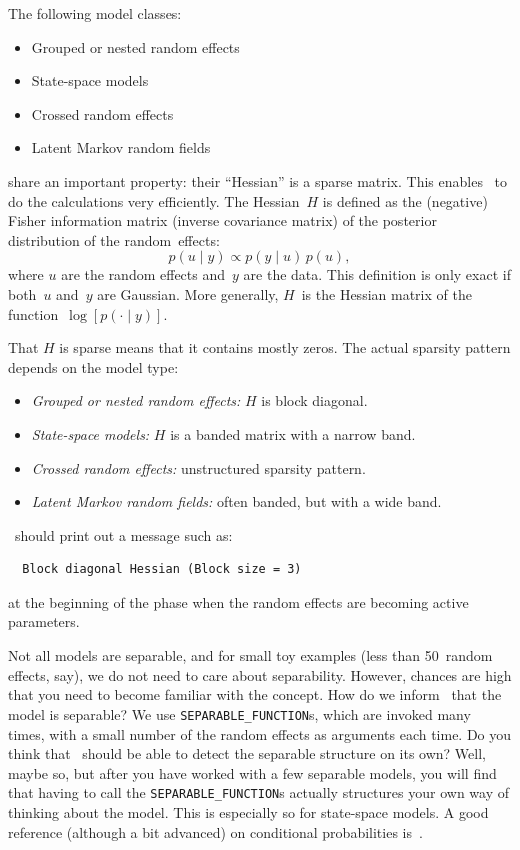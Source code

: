 \documentclass{admbmanual}
\newcommand{\citeasnoun}{\cite}
\begin{document}
The following model classes:
\begin{itemize}
  \item Grouped or nested random effects
  \item State-space models
  \item Crossed random effects
  \item Latent Markov random fields
\end{itemize}
share an important property: their ``Hessian'' is a sparse matrix. This enables
\scAR\ to do the calculations very efficiently. The Hessian~$H$ is defined as
the (negative) Fisher information matrix (inverse covariance matrix) of the
posterior distribution of the random~effects:
\begin{equation}
  p(u \mid y) \propto p(y \mid u)\, p(u),
  \label{p(u|y)}
\end{equation}
where $u$ are the random effects and~$y$ are the data. This definition is only
exact if both~$u$ and~$y$ are Gaussian. More generally, $H$~is the Hessian
matrix of the function~$\log\left[p(\cdot \mid y)\right]$.

That $H$ is sparse means that it contains mostly zeros. The actual sparsity
pattern depends on the model type:
\begin{itemize}
  \item \textit{Grouped or nested random effects:} $H$ is block diagonal.
   \item \textit{State-space models:} $H$ is a banded matrix with a narrow band.
   \item \textit{Crossed random effects:} unstructured sparsity pattern.
   \item \textit{Latent Markov random fields:} often banded, but with a wide
   band.
\end{itemize}
\scAR\ should print out a message such as:
\begin{lstlisting}
  Block diagonal Hessian (Block size = 3)
\end{lstlisting}
at the beginning of the phase when the random effects are becoming active
parameters.

Not all models are separable, and for small toy examples (less than 50~random
effects, say), we do not need to care about separability. However, chances are
high that you need to become familiar with the concept. How do we inform \scAR\
that the model is separable? We use \texttt{SEPARABLE\_FUNCTION}s, which are
invoked many times, with a small number of the random effects as arguments each
time. Do you think that \scAR\ should be able to detect the separable structure
on its own? Well, maybe so, but after you have worked with a few separable
models, you will find that having to call the \texttt{SEPARABLE\_FUNCTION}s
actually structures your own way of thinking about the model. This is especially
so for state-space models. A good reference (although a bit advanced) on
conditional probabilities is~\citeasnoun{rue2005gaussian}.
\end{document}
